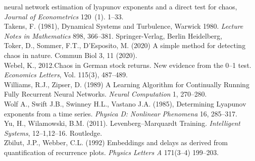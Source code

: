 \documentclass[12pt]{article}
\begin{document}
neural network estimation of lyapunov exponents and a direct test for chaos,
\emph{Journal of Econometrics} 120~(1). 1--33.
\newline{}\\
\noindent Takens, F. (1981),  Dynamical Systems and Turbulence, Warwick 1980. \emph{Lecture Notes in Mathematics} 898, 366--381. Springer-Verlag, Berlin Heidelberg, 
\newline{}\\
\noindent Toker, D., Sommer, F.T.,  D’Esposito, M. (2020) A simple method for detecting chaos in nature. Commun Biol 3, 11 (2020).
\newline{}\\
\noindent Webel, K., 2012.Chaos in German stock returns. New evidence from the 0--1 test.
\emph{Economics Letters}, Vol. 115(3), 487--489.
\newline{}\\
\noindent Williams, R.J., Zipser, D. (1989) A Learning Algorithm for Continually Running Fully Recurrent Neural Networks. \emph{Neural Computation} 1, 270--280.
\newline{}\\
\noindent Wolf A., Swift J.B.,  Swinney H.L.,  Vastano J.A. (1985), Determining Lyapunov exponents from a time series. \emph{Physica D: Nonlinear Phenomena} 16, 285--317.
\newline{}\\
\noindent Yu, H., Wilamowski, B.M. (2011). Levenberg–Marquardt Training. \emph{Intelligent Systems}, 12--1,12--16. Routledge.
\newline{}\\
\noindent Zbilut, J.P.,  Webber, C.L. (1992) Embeddings and delays as derived from quantification of recurrence plots.
\emph{Physics Letters A} 171(3–4) 199--203.
\end{document}
